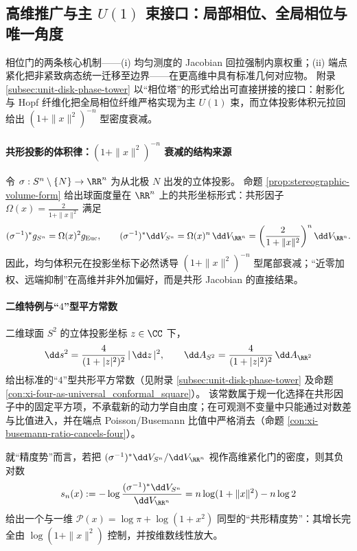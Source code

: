 \subsection{高维推广与主 \texorpdfstring{$U(1)$}{U(1)} 束接口：局部相位、全局相位与唯一角度}\label{subsec:cdim-highdim-u1-bundle}
相位门的两条核心机制——(i) 均匀测度的 Jacobian 回拉强制内禀权重；(ii) 端点紧化把非紧致病态统一迁移至边界——在更高维中具有标准几何对应物。
附录 \ref{subsec:unit-disk-phase-tower} 以“相位塔”的形式给出可直接拼接的接口：射影化与 Hopf 纤维化把全局相位纤维严格实现为主 \(U(1)\) 束，而立体投影体积元拉回给出 \((1+\|x\|^2)^{-n}\) 型密度衰减。

\paragraph{共形投影的体积律：\texorpdfstring{$(1+\|x\|^2)^{-n}$}{(1+||x||^2)^(-n)} 衰减的结构来源}
令 \(\sigma:S^{n}\setminus\{N\}\to\RR^{n}\) 为从北极 \(N\) 出发的立体投影。
命题 \ref{prop:stereographic-volume-form} 给出球面度量在 \(\RR^{n}\) 上的共形坐标形式：共形因子
\(
\Omega(x)=\frac{2}{1+\|x\|^{2}}
\)
满足
\[
(\sigma^{-1})^{\ast}g_{S^{n}}=\Omega(x)^2 g_{\mathrm{Euc}},
\qquad
(\sigma^{-1})^{\ast}\dd V_{S^{n}}=\Omega(x)^n\,\dd V_{\RR^{n}}
=\left(\frac{2}{1+\|x\|^{2}}\right)^{n}\dd V_{\RR^{n}}.
\]
因此，均匀体积元在投影坐标下必然诱导 \((1+\|x\|^2)^{-n}\) 型尾部衰减；“近零加权、远端抑制”在高维并非外加偏好，而是共形 Jacobian 的直接结果。

\paragraph{二维特例与“\texorpdfstring{$4$}{4}”型平方常数}
二维球面 \(S^{2}\) 的立体投影坐标 \(z\in\CC\) 下，
\[
\dd s^{2}=\frac{4}{(1+|z|^{2})^{2}}\,|\,\dd z\,|^{2},
\qquad
\dd A_{S^{2}}=\frac{4}{(1+|z|^{2})^{2}}\,\dd A_{\RR^{2}}
\]
给出标准的“\(4\)”型共形平方常数（见附录 \ref{subsec:unit-disk-phase-tower} 及命题 \ref{con:xi-four-as-universal_conformal_square}）。
该常数属于规一化选择在共形因子中的固定平方项，不承载新的动力学自由度；在可观测不变量中只能通过对数差与比值进入，并在端点 Poisson/Busemann 比值中严格消去（命题 \ref{con:xi-busemann-ratio-cancels-four}）。
\par
就“精度势”而言，若把 \((\sigma^{-1})^{\ast}\dd V_{S^{n}}/\dd V_{\RR^{n}}\) 视作高维紧化门的密度，则其负对数
\[
s_n(x):=-\log\frac{(\sigma^{-1})^{\ast}\dd V_{S^{n}}}{\dd V_{\RR^{n}}}
=n\log(1+\|x\|^{2})-n\log 2
\]
给出一个与一维 \(\mathcal{P}(x)=\log\pi+\log(1+x^2)\) 同型的“共形精度势”：其增长完全由 \(\log(1+\|x\|^2)\) 控制，并按维数线性放大。


